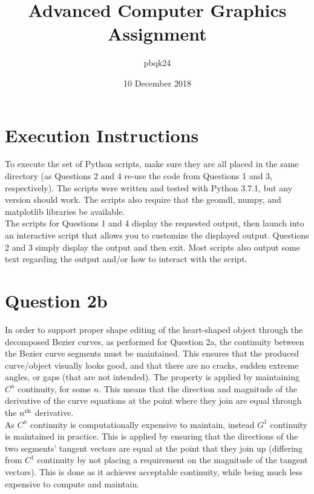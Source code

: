 \documentclass[11pt]{article}
\title{\vspace{-6.0ex}Advanced Computer Graphics Assignment}
\author{pbqk24}
\date{10 December 2018}
\begin{document}
\maketitle

\section*{Execution Instructions}
To execute the set of Python scripts, make sure they are all placed in the same directory (as Questions 2 and 4 re-use the code from Questions 1 and 3, respectively). The scripts were written and tested with Python 3.7.1, but any version should work. The scripts also require that the geomdl, numpy, and matplotlib libraries be available.\\

The scripts for Questions 1 and 4 display the requested output, then launch into an interactive script that allows you to customize the displayed output. Questions 2 and 3 simply display the output and then exit. Most scripts also output some text regarding the output and/or how to interact with the script.

\section*{Question 2b}

In order to support proper shape editing of the heart-shaped object through the decomposed Bezier curves, as performed for Question 2a, the continuity between the Bezier curve segments must be maintained. This ensures that the produced curve/object visually looks good, and that there are no cracks, sudden extreme angles, or gaps (that are not intended). The property is applied by maintaining $C^n$ continuity, for some $n$. This means that the direction and magnitude of the derivative of the curve equations at the point where they join are equal through the $n\textsuperscript{th}$ derivative.\\

As $C^n$ continuity is computationally expensive to maintain, instead $G^1$ continuity is maintained in practice. This is applied by ensuring that the directions of the two segments' tangent vectors are equal at the point that they join up (differing from $C^1$ continuity by not placing a requirement on the magnitude of the tangent vectors). This is done as it achieves acceptable continuity, while being much less expensive to compute and maintain.
\end{document}
